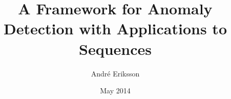 \title{A Framework for Anomaly Detection with Applications to Sequences}
\author{André Eriksson}
\date{May 2014}
